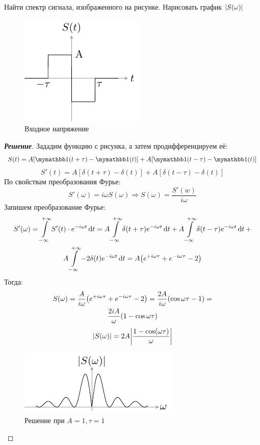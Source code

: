

\begin{task}
	Найти спектр сигнала, изображенного на рисунке. Нарисовать график $\abs{S(\omega)}$
\end{task}
\begin{figure}[h!]
	\centering
	\includegraphics[scale=2]{ris/task15_input}
	\caption{Входное напряжение}
	\label{fig:15.1}
\end{figure}
\begin{proof}[\rm{\textbf{Решение}}]
	Зададим функцию с рисунка, а затем продифференцируем её:
	$$S(t)=A[\H(t+\tau)-\H(t)]+A[\H(t-\tau)-\H(t)]$$
	$$S'(t)=A[\delta(t+\tau)-\delta(t)]+A[\delta(t- \tau)-\delta(t)] $$
	По свойствам преобразования Фурье:
	\begin{equation}
		S'(\omega)=i \omega S(\omega) \Longrightarrow S(\omega)
		=\frac{S'(w)}{i \omega}
	\end{equation}
	Запишем преобразование Фурье:
	\begin{gather*}
		S'(\omega)=\int\limits_{-\infty}^{+\infty} S'(t)\cdot e^{-i \omega t} \dd{t}=
		A \int\limits_{-\infty}^{+\infty} \delta(t+ \tau) e^{-i \omega t} \dd{t}+
		A \int\limits_{-\infty}^{+\infty} \delta(t- \tau) e^{-i \omega t} \dd{t}+\\
		A \int\limits_{-\infty}^{+\infty} -2\delta(t) e^{-i \omega t} \dd{t}=
		A \qty(e^{+ i \omega \tau}+e^{-i \omega \tau}-2 )
	\end{gather*}
	Тогда:
	\begin{gather*}
		S(\omega)=\frac{A}{i \omega}
		\qty(e^{+ i \omega \tau}+e^{-i \omega \tau}-2 )=
		\frac{2A}{i \omega}(\cos{\omega \tau}-1)=
		\\
		\frac{2iA}{\omega}(1-\cos{\omega \tau})
	\end{gather*}
	\begin{equation}
		\abs{S(\omega)}=2A\abs{ \frac{1-\cos(\omega \tau)}{\omega} }
	\end{equation}
\begin{figure}[h!]
	\centering
	\includegraphics[scale=2]{ris/task15_out}
	\caption{Решение при $A=1,\tau=1$}
	\label{fig:15.2}
\end{figure}

\end{proof}

